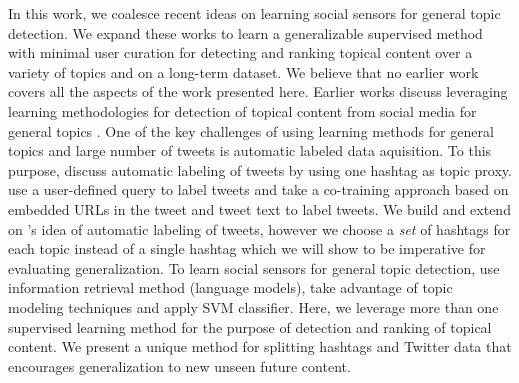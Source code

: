 

\COMMENT
{\color{red}
In this work, we coalesce recent ideas on learning social sensors for general topic detection. We expand these works to learn a generalizable supervised method with minimal user curation for detecting and ranking topical content over a variety of topics and on a long-term dataset. We believe that no earlier work covers all the aspects of the work presented here.
Earlier works discuss leveraging learning methodologies for detection of topical content from social media for general topics \citep{lin2011smoothing,yang2014large,magdy}. One of the key challenges of using learning methods for general topics and large number of tweets is automatic labeled data aquisition. To this purpose, \cite{lin2011smoothing} discuss automatic labeling of tweets by using one hashtag as topic proxy. \cite{magdy} use a user-defined query to label tweets and \cite{yang2014large} take a co-training approach based on embedded URLs in the tweet and tweet text to label tweets. We build and extend on \citep{lin2011smoothing}'s idea of automatic labeling of tweets, however we choose a \emph{set} of hashtags for each topic instead of a single hashtag which we will show to be imperative for evaluating generalization. To learn social sensors for general topic detection, \citep{lin2011smoothing} use information retrieval method (language models), \cite{yang2014large} take advantage of topic modeling techniques and \cite{magdy} apply SVM classifier. Here, we leverage more than one supervised learning method for the purpose of detection and ranking of topical content. We present a unique method for splitting hashtags and Twitter data that encourages generalization to new unseen future content. 
}
